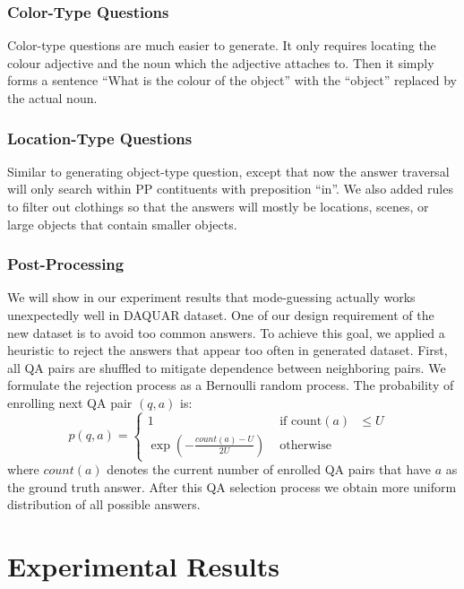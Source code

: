 \documentclass{article}
\renewcommand{\#}[1]{\textbf{#1}}
\begin{document}
\subsubsection{Color-Type Questions}
Color-type questions are much easier to generate. It only requires locating the colour adjective and the noun which the adjective attaches to. Then it simply forms a sentence ``What is the colour of the object'' with the ``object'' replaced by the actual noun.

\subsubsection{Location-Type Questions}
Similar to generating object-type question, except that now the answer traversal will only search within PP contituents with preposition ``in''. We also added rules to filter out clothings so that the answers will mostly be locations, scenes, or large objects that contain smaller objects.

\subsubsection{Post-Processing}
We will show in our experiment results that mode-guessing actually works unexpectedly well in DAQUAR dataset. One of our design requirement of the new dataset is to avoid too common answers.  To achieve this goal, we applied a heuristic to reject the answers that appear too often in generated dataset. First, all QA pairs are shuffled to mitigate dependence between neighboring pairs. We formulate the rejection process as a Bernoulli random process. The probability of enrolling next QA pair $(q, a)$ is:
\begin{equation}
p(q, a) = \left\{ \begin{array}{cl}
1 &\mbox{ if count$(a)$ $\le U$ } \\
\exp\left(-\frac{count(a) - U}{2U}\right) &\mbox{ otherwise }
\end{array} \right.
\end{equation}
where $count(a)$ denotes the current number of enrolled QA pairs that have $a$ as the ground truth answer. After this QA selection process we obtain more uniform distribution of all possible answers.

\section{Experimental Results}
\end{document}
